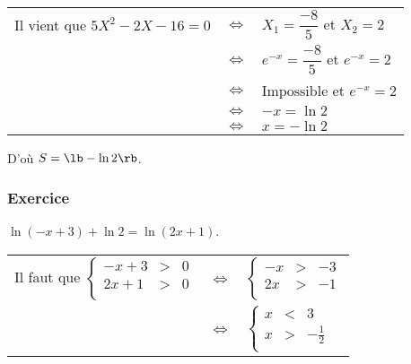 \begin{tabular}{lll}
Il vient que $5X^2 - 2X - 16 = 0$ & $\Longleftrightarrow$ & $X_1 = \dfrac{-8}{5}$ et $X_2 = 2$ \vspace*{.3cm} \\
& $\Longleftrightarrow$ & $e^{-x} = \dfrac{-8}{5}$ et $e^{-x} = 2$ \\
& $\Longleftrightarrow$ & $\mathrm{Impossible}$ et $e^{-x} = 2$ \\
& $\Longleftrightarrow$ & $-x = \ln 2$ \\
& $\Longleftrightarrow$ & $x = -\ln 2$ \\
\end{tabular}

\vspace*{.3cm}

D'où $S = \lb -\ln 2 \rb$. 

\newpage

\subsubsection*{Exercice }

$\ln \left(-x+3\right) + \ln 2 = \ln \left(2x +1\right)$. \\

\begin{tabular}{lll}
Il faut que $\left\{
  \begin{array}{rll}
    -x+3 & > & 0 \\
    2x+1 & > & 0 \\
  \end{array}
\right.$
& 
$\Longleftrightarrow$ & 
$\left\{
  \begin{array}{rll}
    -x & > & -3 \\
    2x & > & -1 \\
  \end{array}
\right.$ \\

& 

$\Longleftrightarrow$ &

$\left\{
  \begin{array}{rll}
    x & < & 3 \\
    x & > & -\frac{1}{2} \\
  \end{array}
\right.$ \\
\end{tabular}

\vspace*{.3cm}

